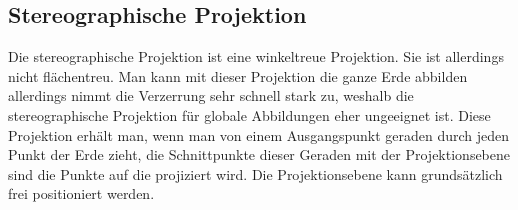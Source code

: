 \subsection{Stereographische Projektion}
\label{sec:stereo}
Die stereographische Projektion ist eine winkeltreue Projektion. Sie ist allerdings nicht flächentreu.
Man kann mit dieser Projektion die ganze Erde abbilden allerdings nimmt die Verzerrung sehr schnell stark zu, weshalb die stereographische Projektion  für globale Abbildungen eher ungeeignet ist. Diese Projektion erhält man, wenn man von einem Ausgangspunkt geraden durch jeden Punkt der Erde zieht, die Schnittpunkte dieser Geraden mit der Projektionsebene sind die Punkte auf die projiziert wird.
Die Projektionsebene kann grundsätzlich frei positioniert werden.